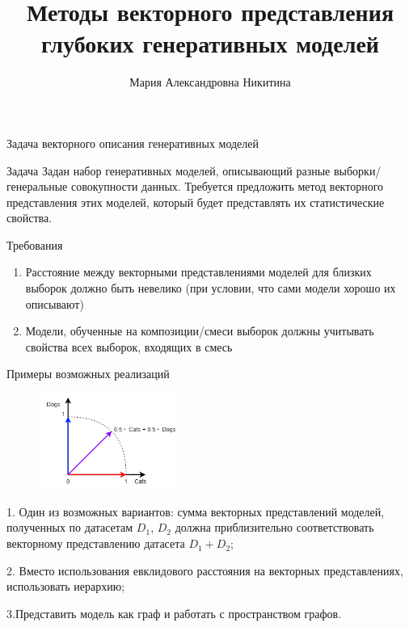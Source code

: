 \documentclass{beamer}
\title[\hbox to 56mm{Векторное представление моделей}]{Методы векторного представления глубоких генеративных моделей}
\author[М.\,А. Никитина]{Мария Александровна Никитина}
\institute{Московский физико-технический институт}
\date{\footnotesize
\par\smallskip\emph{Кафедра:} Интеллектуальный анализ данных
\par\smallskip\emph{Научный руководитель:} кандидат ф.-м. наук О.\,Ю.~Бахтеев
\par\smallskip\emph{Научный консультант:} А.\,Ю.~Бишук
\par\bigskip\small 2024}
\begin{document}
\begin{frame}
\thispagestyle{empty}
\maketitle
\end{frame}
\begin{frame}{Задача векторного описания генеративных моделей}
\begin{block}{Задача}
Задан набор генеративных моделей, описывающий разные выборки/генеральные совокупности данных. Требуется предложить метод векторного представления этих моделей, который будет представлять их статистические свойства.
\end{block}
\begin{block}{Требования}
\begin{enumerate}
    \item Расстояние между векторными представлениями моделей для близких выборок должно быть невелико (при условии, что сами модели хорошо их описывают)
    \item Модели, обученные на композиции/смеси выборок должны учитывать свойства всех выборок, входящих в смесь
\end{enumerate}
\end{block}
\end{frame}
\begin{frame}{Примеры возможных реализаций}
\begin{figure}
  \vspace{-20pt}
  \begin{center}
    \includegraphics[width=0.4\textwidth]{Pictures/Classes.png}
  \end{center}
  \vspace{-20pt}
\end{figure}
1. Один из возможных вариантов: сумма векторных представлений моделей, полученных по датасетам $D_1$, $D_2$ должна приблизительно соответствовать векторному представлению датасета $D_1 + D_2$;

\bigskip

2. Вместо использования евклидового расстояния на векторных представлениях, использовать иерархию;

\bigskip

3.Представить модель как граф и работать с пространством графов.
\end{frame}
\end{document}
